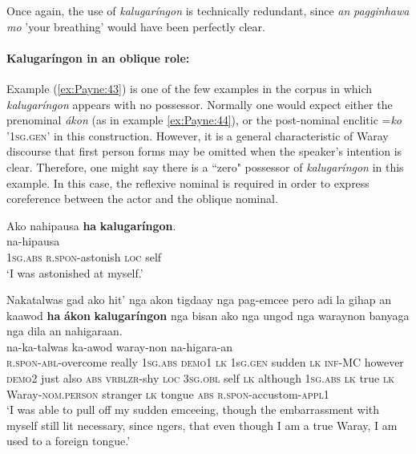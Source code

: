 \documentclass[output=paper]{langscibook}
\begin{document}
Once again, the use of \textit{kalugaríngon} is technically redundant, since \textit{an} \textit{pagginhawa} \textit{mo} 'your breathing' would have been perfectly clear. 

\paragraph*{{Kalugaríngon} {in} {an} {oblique} {role:}} Example (\ref{ex:Payne:43}) is one of the few examples in the corpus in which \textit{kalugaríngon} appears with no possessor. Normally one would expect either the prenominal \textit{ákon} (as in example \ref{ex:Payne:44}), or the post-nominal enclitic =\textit{ko} '1\textsc{sg.gen}{}' in this construction. However, it is a general characteristic of Waray discourse that first person forms may be omitted when the speaker's intention is clear. Therefore, one might say there is a ``zero" possessor of \textit{kalugaríngon} in this example. In this case, the reflexive nominal is required in order to express coreference between the actor and the oblique nominal.

\ea
\label{ex:Payne:43}
\glll
Ako nahipausa \textbf{ha} \textbf{kalugaríngon}.\\
{ } na-hipausa\\
1\textsc{sg.abs} \textsc{r.spon}{-astonish} \textsc{loc} self\\
\glt ‘I was astonished at myself.'
\z

\ea
\label{ex:Payne:44}
\glll
Nakatalwas gad ako hit' nga akon tigdaay nga pag-emcee pero adi la gihap an kaawod \textbf{ha} \textbf{ákon} \textbf{kalugaríngon} nga bisan ako nga ungod nga waraynon banyaga nga dila an nahigaraan.\\
na-ka-talwas { } { } { } { } { } { } { } { } { } { } { } { } { } ka-awod { } { } { } { } { } { } { } { } { } waray-non { } { } { } { } na-higara-an\\
\textsc{r.spon-abl}{}-overcome really 1\textsc{sg.abs} \textsc{demo1} \textsc{lk} 1s\textsc{g.gen} sudden \textsc{lk} \textsc{inf}{}-MC however \textsc{demo2} just also \textsc{abs} \textsc{vrblzr}{}-shy \textsc{loc} 3\textsc{sg.obl} self \textsc{lk} although 1\textsc{sg.abs} \textsc{lk} true \textsc{lk} Waray-\textsc{nom.person} stranger \textsc{lk} tongue \textsc{abs} \textsc{r.spon-}accustom-\textsc{appl}1\\
\glt ‘I was able to pull off my sudden emceeing, though the embarrassment with myself still lit necessary, since ngers, that even though I am a true Waray, I am used to a foreign tongue.'
\z
\end{document}
